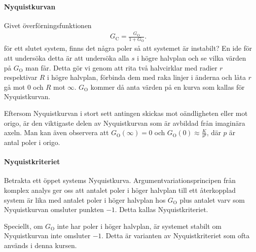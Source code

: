 \paragraph{Nyquistkurvan}
Givet överförningsfunktionen
\begin{align*}
	G_{\text{C}} = \frac{G_{\text{O}}}{1 + G_{\text{O}}}.
\end{align*}
för ett slutet system, finns det några poler så att systemet är instabilt? En ide för att undersöka detta är att undersöka alla $s$ i högre halvplan och se vilka värden på $G_{\text{O}}$ man får. Detta gör vi genom att rita två halvcirklar med radier $r$ respektivar $R$ i högre halvplan, förbinda dem med raka linjer i änderna och låta $r$ gå mot $0$ och $R$ mot $\infty$. $G_{\text{O}}$ kommer då anta värden på en kurva som kallas för Nyquistkurvan.

Eftersom Nyquistkurvan i stort sett antingen skickas mot oändligheten eller mot origo, är den viktigaste delen av Nyquistkurvan som är avbildad från imaginära axeln. Man kan även observera att $G_{\text{O}}(\infty) = 0$ och $G_{\text{O}}(0)\approx\frac{K}{s^{p}}$, där $p$ är antal poler i origo.

\paragraph{Nyquistkriteriet}
Betrakta ett öppet systems Nyquistkurva. Argumentvariationsprincipen från komplex analys ger oss att antalet poler i höger halvplan till ett återkopplad system är lika med antalet poler i höger halvplan hos $G_{\text{O}}$ plus antalet varv som Nyquistkurvan omsluter punkten $-1$. Detta kallas Nyquistkriteriet.

Speciellt, om $G_{\text{O}}$ inte har poler i höger halvplan, är systemet stabilt om Nyquistkurvan inte omsluter $-1$. Detta är varianten av Nyquistkriteriet som ofta används i denna kursen.